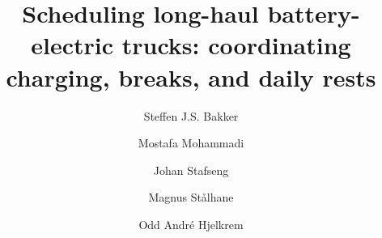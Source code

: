\documentclass[3p,11pt,authoryear]{elsarticle}  %
\begin{document}

\begin{frontmatter}


\title{Scheduling long-haul battery-electric trucks: coordinating charging, breaks, and daily rests}
%



\author[indokaddress]{Steffen J.S. Bakker} 
            \author[indokaddress]{Mostafa Mohammadi}
            \author[indokaddress]{Johan Stafseng}
            \author[indokaddress]{Magnus Stålhane}
            \author[sintefaddress]{Odd André Hjelkrem}

		\address[indokaddress]{Department of Industrial Economics and Technology Management, Norwegian University of Science and Technology, Alfred Getz veg 3, NO-7491 Trondheim, Norway}
        \address[sintefaddress]{Department of Energy Systems, SINTEF Energy Research - Trondheim, Norway}



\end{frontmatter}
\end{document}
